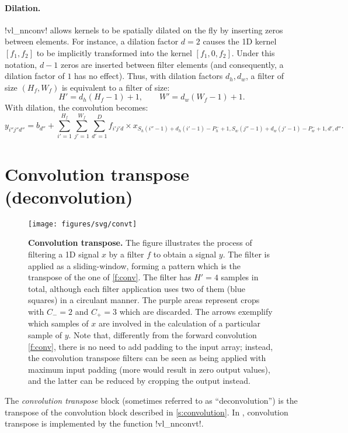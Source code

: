 \paragraph{Dilation.} !vl_nnconv! allows kernels to be spatially dilated on the fly by inserting zeros between elements. For instance, a dilation factor $d=2$ causes the 1D kernel $[f_1,f_2]$ to be implicitly transformed into the kernel $[f_1,0,f_2]$. Under this notation, $d-1$ zeros are inserted between filter elements (and consequently, a dilation factor of $1$ has no effect). Thus, with dilation factors $d_h,d_w$, a filter of size $(H_f,W_f)$ is equivalent to a filter of size:
\[
  H' = d_h(H_f - 1) + 1,
  \qquad
  W' = d_w(W_f - 1) + 1.
\]
With dilation, the convolution becomes:
\[
y_{i''j''d''}
=
b_{d''}
+
\sum_{i'=1}^{H_f}
\sum_{j'=1}^{W_f}
\sum_{d'=1}^D
f_{i'j'd} \times x_{
S_h (i''-1)+d_h(i'-1)-P_h^-+1,
S_w (j''-1)+d_w(j'-1)-P_w^-+1,
d',d''}.
\]


\section{Convolution transpose (deconvolution)}\label{s:convt}

\begin{figure}[t]
	\centering
	\texttt{[image: figures/svg/convt]}
	\caption{\textbf{Convolution transpose.} The figure illustrates the process of filtering a 1D signal $x$ by a filter $f$ to obtain a signal $y$. The filter is applied as a sliding-window, forming a pattern which is the transpose of the one of \cref{f:conv}. The filter has $H'=4$ samples in total, although each filter application uses two of them (blue squares) in a circulant manner. The purple areas represent crops with $C_-=2$ and $C_+=3$ which are discarded. The arrows exemplify which samples of $x$ are involved in the calculation of a particular sample of $y$. Note that, differently from the forward convolution \cref{f:conv}, there is no need to add padding to the input array; instead, the convolution transpose filters can be seen as being applied with maximum input padding (more would result in zero output values), and the latter can be reduced by cropping the output instead.}\label{f:convt}
\end{figure}

The \emph{convolution transpose} block (sometimes referred to as ``deconvolution'') is the transpose of the convolution block described in \cref{s:convolution}. In \matconvnet, convolution transpose is  implemented by the function !vl_nnconvt!.


